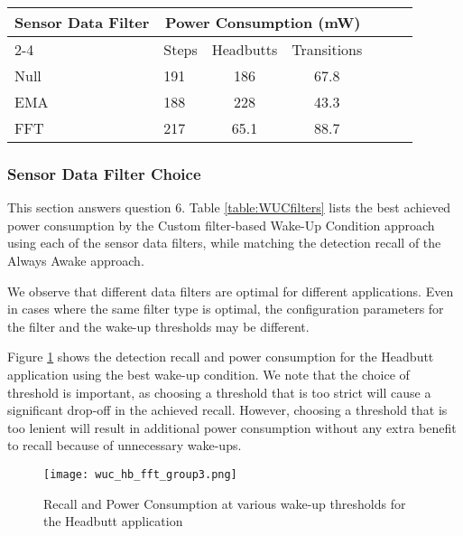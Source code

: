 \begin{table*}[t]
\centering
    \begin{tabular}{|l|l|c|c|c|c|c|}
	\hline
    \multirow{2}{*}{Sensor Data Filter}    	& \multicolumn{3}{c|}{Power Consumption (mW)} \\ \cline{2-4}
							& Steps	& Headbutts	& Transitions 	\\ \hline
    Null     				& 191		& 186		& 67.8 			\\ \hline
	EMA   				& 188		& 228		& 43.3 			\\ \hline
	FFT 				& 217		& 65.1 		& 88.7 			\\ \hline
	
    \end{tabular}
	\caption{Summary of best achieved power consumption for each of the sensor data filters for Group 2}
	\label{table:WUCfilters}
\end{table*}

\subsubsection{Sensor Data Filter Choice}

This section answers question 6. Table \ref{table:WUCfilters} lists
the best achieved power consumption by the Custom filter-based Wake-Up
Condition approach using each of the sensor data filters, while
matching the detection recall of the Always Awake approach. 

We observe that different data filters are optimal for different
applications. Even in cases where the same filter type is optimal, the
configuration parameters for the filter and the wake-up thresholds may
be different. 

Figure \ref{fig:wucHeadbuttFFTRecallPowerGroup3} shows the detection
recall and power consumption for the Headbutt application using the
best wake-up condition.  We note that the choice of threshold is
important, as choosing a threshold that is too strict will cause a
significant drop-off in the achieved recall.  However, choosing a
threshold that is too lenient will result in additional power
consumption without any extra benefit to recall because of unnecessary
wake-ups.

\begin{figure}[h]
	\texttt{[image: wuc\_hb\_fft\_group3.png]}
	\caption{Recall and Power Consumption at various wake-up thresholds for the Headbutt application}
    \label{fig:wucHeadbuttFFTRecallPowerGroup3}
\end{figure}



